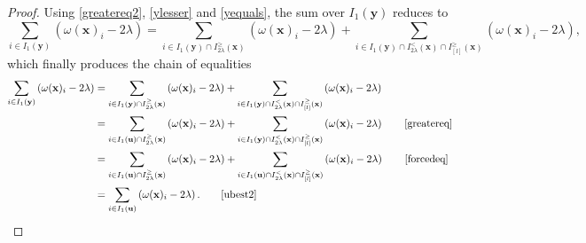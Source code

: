 \documentclass[11pt,a4paper]{article}
\newcommand{\eqjust}[1]{\qquad\eqref{#1}}
\theoremstyle{plain}
\theoremstyle{definition}
\theoremstyle{remark}
\newcommand*\x{\mathbf{x}}
\newcommand*\U{\mathbf{u}}
\newcommand*\y{\mathbf{y}}
\begin{document}
\begin{proof}
  Using \eqref{greatereq2}, \eqref{ylesser} and \eqref{yequals}, the sum over
  \(I_1(\y)\) reduces to
  $$
    \sum_{i \in I_1(\y) }\left(\omega(\x)_i-2 \lambda\right)=\sum_{i \in I_1(\y)\cap I_{2\lambda}^\geq(\x) }\left(\omega(\x)_i-2 \lambda\right)+\sum_{i \in I_1(\y)\cap I_{2\lambda}^<(\x)\cap I_{[l]}^\geq(\x) }\left(\omega(\x)_i-2 \lambda\right),
  $$
  which finally produces the chain of equalities
  \begin{align*}
    \sum_{i \in I_1(\y) }\left(\omega(\x)_i-2 \lambda\right) & =
    \sum_{i \in I_1(\y)\cap I_{2\lambda}^\geq(\x) }\left(\omega(\x)_i-2 \lambda\right)+\sum_{i \in I_1(\y)\cap I_{2\lambda}^<(\x)\cap I_{[l]}^\geq(\x) }\left(\omega(\x)_i-2 \lambda\right)                                                             \\
                                                             & =\sum_{i \in I_1(\U)\cap I_{2\lambda}^\geq(\x) }\left(\omega(\x)_i-2 \lambda\right)+\sum_{i \in I_1(\y)\cap I_{2\lambda}^<(\x)\cap I_{[l]}^\geq(\x) }\left(\omega(\x)_i-2 \lambda\right)
    \eqjust{greatereq}                                                                                                                                                                                                                                  \\
                                                             & =\sum_{i \in I_1(\U)\cap I_{2\lambda}^\geq(\x) }\left(\omega(\x)_i-2 \lambda\right)+\sum_{i \in I_1(\U)\cap I_{2\lambda}^<(\x)\cap I_{[l]}^\geq(\x) }\left(\omega(\x)_i-2 \lambda\right)
    \eqjust{forcedeq}                                                                                                                                                                                                                                   \\
                                                             & =\sum_{i \in I_1(\U) }\left(\omega(\x)_i-2 \lambda\right). \eqjust{ubest2}
  \end{align*}


\end{proof}
\end{document}
